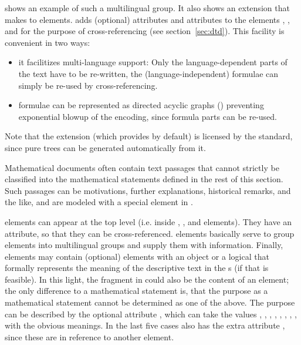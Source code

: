{} shows an example of such a multilingual group. It also
shows an extension that {\omdoc} makes to {\openmath} elements. {\omdoc} adds
(optional) attributes {} and {}
attributes to the {\openmath} elements {}, {},
{} and {} for the purpose of cross-referencing
(see section~\ref{sec:dtd}).  This facility is convenient in two ways:
\begin{itemize}
\item it facilitizes multi-language support: Only the language-dependent parts of
  the text have to be re-written, the (language-independent) formulae can simply
  be re-used by cross-referencing.
\item formulae can be represented as directed acyclic graphs () preventing
  exponential blowup of the encoding, since formula parts can be re-used.
\end{itemize}
Note that the extension (which {\mathml} provides by default) is licensed by the
{\openmath} standard, since pure {\openmath} trees can be generated automatically
from it.

Mathematical documents often contain text passages that cannot strictly be
classified into the mathematical statements defined in the rest of this section.
Such passages can be motivations, further explanations, historical remarks, and
the like, and are modeled with a special element {} in {\omdoc}.

{} elements can appear at the top level (i.e. inside {},
{}, and {} elements). They have an {}
attribute, so that they can be cross-referenced. {} elements
basically serve to group {} elements into multilingual
groups and supply them
with {} information. Finally, {} elements may
contain (optional) {} elements with an {\openmath} object or a
logical {} that formally represents the meaning of the descriptive
text in the {}s (if that is feasible).  In this light, the {\omdoc}
fragment in {} could also be the content of an
{} element; the only difference to a mathematical statement is,
that the purpose as a mathematical statement cannot be determined as one of the
above. The purpose can be described by the optional attribute
{}, which can take the values
{}, {},
{}, {},
{}, {},
{}, {},
{} with the obvious meanings. In the last five
cases {} also has the extra attribute {},
since these are in reference to another {\omdoc} element.

